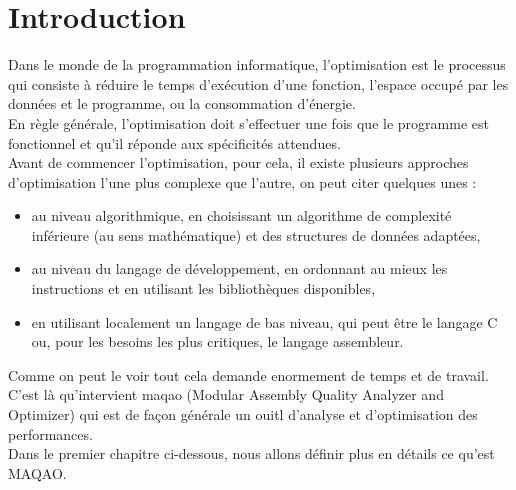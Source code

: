 
\section{Introduction}

Dans le monde de la programmation informatique, l’optimisation est le processus qui consiste à réduire le temps d'exécution d’une fonction, l’espace occupé par les données et le programme, ou la consommation d'énergie.\\

En règle générale, l'optimisation doit s’effectuer une fois que le programme est fonctionnel et qu’il réponde aux spécificités attendues.\\

Avant de commencer l'optimisation, pour cela, il existe plusieurs approches d’optimisation l’une plus complexe que l’autre, on peut citer quelques unes :

\begin{itemize}
    \item au niveau algorithmique, en choisissant un algorithme de complexité inférieure (au sens mathématique) et des structures de données adaptées,
    
    \item au niveau du langage de développement, en ordonnant au mieux les instructions et en utilisant les bibliothèques disponibles,
    
    \item en utilisant localement un langage de bas niveau, qui peut être le langage C ou, pour les besoins les plus critiques, le langage assembleur.

\end{itemize}

	Comme on peut le voir tout cela demande enormement de temps et de travail. C’est là qu'intervient maqao (Modular Assembly Quality Analyzer and Optimizer) qui est de façon générale un ouitl d'analyse et d'optimisation des performances.\\
	
	Dans le premier chapitre ci-dessous, nous allons définir plus en détails ce qu'est MAQAO.
	
